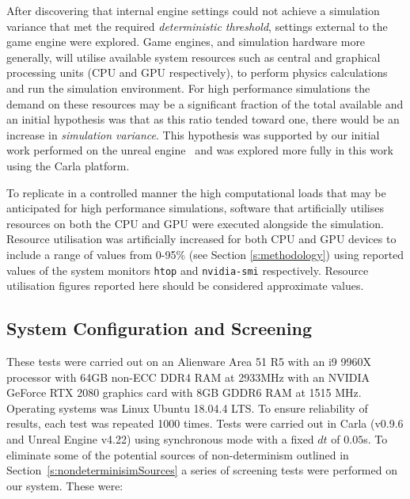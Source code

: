 \documentclass[letterpaper, 10 pt, journal, twoside]{IEEEtran}
\begin{document}
After discovering that internal engine settings could not achieve a simulation variance that met the required \textit{deterministic threshold}, settings external to the game engine were explored. 
%
Game engines, and simulation hardware more generally, will utilise available system resources such as central and graphical processing units (CPU and GPU respectively), to perform physics calculations and run the simulation environment. 
%
For high performance simulations the demand on these resources may be a significant fraction of the total available and an initial hypothesis was that as this ratio tended toward one, there would be an increase in \textit{simulation variance}. This hypothesis was supported by our initial work performed on the unreal engine~\cite{TSLUnrealEngineTesting} and was explored more fully in this work using the Carla platform.

To replicate in a controlled manner the high computational loads that may be anticipated for high performance simulations, software that artificially utilises resources on both the CPU and GPU were executed alongside the simulation. 
%
Resource utilisation was artificially increased for both CPU and GPU devices to include a range of values from 0-95\% (see Section \ref{s:methodology}) using reported values of the system monitors \texttt{htop} and \texttt{nvidia-smi} respectively. Resource utilisation figures reported here should be considered approximate values.

\subsection{System Configuration and Screening}\label{screening}
These tests were carried out on an Alienware Area 51 R5 with an i9 9960X processor with 64GB non-ECC DDR4 RAM at 2933MHz with an NVIDIA GeForce RTX 2080 graphics card with 8GB GDDR6 RAM at 1515 MHz. Operating systems was Linux Ubuntu 18.04.4 LTS. To ensure reliability of results, each test was repeated 1000 times. Tests were carried out in Carla (v0.9.6 and Unreal Engine v4.22) using synchronous mode with a fixed $dt$ of $0.05$s. To eliminate some of the potential sources of non-determinism outlined in Section~\ref{s:nondeterminisimSources} a series of screening tests were performed on our system. These were:
\end{document}
